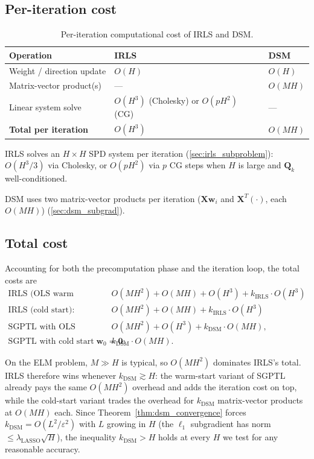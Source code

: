 \subsection{Per-iteration cost}

\begin{table}[htbp]
\centering
\begin{tabular}{lll}
\toprule
\textbf{Operation} & \textbf{IRLS} & \textbf{DSM} \\
\midrule
Weight / direction update & $O(H)$ & $O(H)$ \\
Matrix-vector product(s) & --- & $O(MH)$ \\
Linear system solve & $O(H^3)$ (Cholesky) or $O(pH^2)$ (CG) & --- \\
\midrule
\textbf{Total per iteration} & $O(H^3)$ & $O(MH)$ \\
\bottomrule
\end{tabular}
\caption{Per-iteration computational cost of IRLS and DSM.}
\label{tab:comp_cost}
\end{table}

IRLS solves an $H \times H$ SPD system per iteration
(\ref{sec:irls_subproblem}): $O(H^3/3)$ via Cholesky, or $O(pH^2)$
via $p$ CG steps when $H$ is large and $\mathbf{Q}_k$ well-conditioned.

DSM uses two matrix-vector products per iteration ($\mathbf{X}\mathbf{w}_i$
and $\mathbf{X}^T(\cdot)$, each $O(MH)$) (\ref{sec:dsm_subgrad}).

\subsection{Total cost}

Accounting for both the precomputation phase and the iteration loop, the total costs are
\begin{align*}
    \text{IRLS (OLS warm start):}                 &\quad {O(MH^2) + O(MH) + O(H^3)} + k_{\mathrm{IRLS}} \cdot O(H^3) \\
    \text{IRLS (cold start):}                 &\quad {O(MH^2) + O(MH)} + k_{\mathrm{IRLS}} \cdot O(H^3) \\
    \text{SGPTL with OLS warm start:}             &\quad O(MH^2) + O(H^3) + k_{\mathrm{DSM}} \cdot O(MH), \\
    \text{SGPTL with cold start $\mathbf{w}_0 = \mathbf{0}$:} &\quad k_{\mathrm{DSM}} \cdot O(MH).
\end{align*}

On the ELM problem, $M \gg H$ is typical, so $O(MH^2)$ dominates IRLS's total. IRLS therefore wins whenever $k_{\mathrm{DSM}} \gtrsim H$: the warm-start variant of SGPTL already pays the same $O(MH^2)$ overhead and adds the iteration cost on top, while the cold-start variant trades the overhead for $k_{\mathrm{DSM}}$ matrix-vector products at $O(MH)$ each. Since Theorem~\ref{thm:dsm_convergence} forces $k_{\mathrm{DSM}} = O(L^2/\varepsilon^2)$ with $L$ growing in $H$ (the $\ell_1$ subgradient has norm $\le \lambda_{\text{LASSO}}\sqrt{H}$), the inequality $k_{\mathrm{DSM}} > H$ holds at every $H$ we test for any reasonable accuracy.

